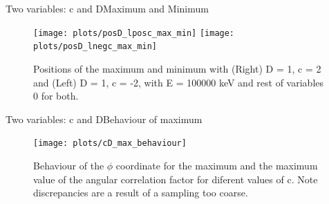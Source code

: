 \documentclass{beamer}
\begin{document}
\begin{frame}{Two variables: c and D}{Maximum and Minimum}
	\begin{figure}
		\centering
		\texttt{[image: plots/posD\_lposc\_max\_min]}
		\texttt{[image: plots/posD\_lnegc\_max\_min]}
		\caption{Positions of the maximum and minimum with (Right) D = 1, c = 2 and (Left) D = 1, c = -2, with E = 100000 keV and rest of variables 0 for both.}
	\end{figure}
\end{frame}
\begin{frame}{Two variables: c and D}{Behaviour of maximum}
	\begin{figure}
		\centering
		\texttt{[image: plots/cD\_max\_behaviour]}
		\caption{Behaviour of the $\phi$ coordinate for the maximum and the maximum value of the angular correlation factor for diferent values of c. Note discrepancies are a result of a sampling too coarse.}
	\end{figure}
\end{frame}
\end{document}
